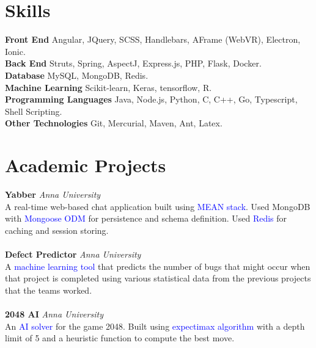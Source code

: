 \documentclass{resume}
\begin{document}
\section*{Skills}
\noindent
\textbf{Front End} Angular, JQuery, SCSS, Handlebars, AFrame (WebVR), Electron, Ionic. \\
\textbf{Back End} Struts, Spring, AspectJ, Express.js, PHP, Flask, Docker.\\
\textbf{Database} MySQL, MongoDB, Redis. \\
\textbf{Machine Learning} Scikit-learn, Keras, tensorflow, R. \\
\textbf{Programming Languages} Java, Node.js, Python, C, C++, Go, Typescript, Shell Scripting.\\
\textbf{Other Technologies} Git, Mercurial, Maven, Ant, Latex.

\section*{Academic Projects}
\noindent
\textbf{Yabber} \hfill \textit{Anna University} \\
A real-time web-based chat application built using \textcolor{blue}{MEAN stack}. Used MongoDB with \textcolor{blue}{Mongoose ODM} for persistence and schema definition. Used \textcolor{blue}{Redis} for caching and session storing.  \\
\\
\textbf{Defect Predictor} \hfill \textit{Anna University} \\
A \textcolor{blue}{machine learning tool} that predicts the number of bugs that might occur when that project is completed using various statistical data from the previous projects that the teams worked.\\
\\
\textbf{2048 AI} \hfill \textit{Anna University} \\
An \textcolor{blue}{AI solver} for the game 2048. Built using \textcolor{blue}{expectimax algorithm} with a depth limit of 5 and a heuristic function to compute the best move. \\
\end{document}
